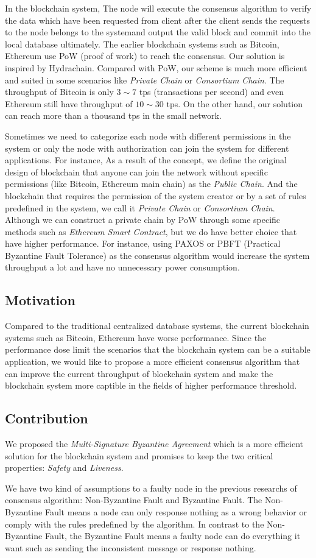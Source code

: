 In the blockchain system, The node will execute the consensus algorithm to verify the data which have been requested from client after the client sends the requests to the node belongs to the systemand output the valid block and commit into the local database ultimately.
The earlier blockchain systems such as Bitcoin, Ethereum use PoW (proof of work) to reach the consensus. 
Our solution is inspired by Hydrachain\cite{Hydrachain}. Compared with PoW, our scheme is much more efficient and suited in some scenarios like {\em Private Chain} or {\em Consortium Chain}.
The throughput of Bitcoin is only $3 \sim 7$ tps (transactions per second)\cite{BitcoinThroughput} and even Ethereum still have throughput of $10 \sim 30$ tps. On the other hand, our solution can reach more than a thousand tps in the small network.\par
	Sometimes we need to categorize each node with different permissions in the system or only the node with authorization can join the system for different applications.
For instance, 
As a result of the concept, we define the original design of blockchain that anyone can join the network without specific permissions (like Bitcoin, Ethereum main chain) as the {\em Public Chain}. 
And the blockchain that requires the permission of the system creator or by a set of rules predefined in the system, we call it {\em Private Chain} or {\em Consortium Chain}.
Although we can construct a private chain by PoW through some specific methods such as {\em Ethereum Smart Contract}, but we do have better choice that have higher performance.
For instance, using PAXOS\cite{PAXOS} or PBFT (Practical Byzantine Fault Tolerance)\cite{PBFT} as the consensus algorithm would increase the system throughput a lot and have no unnecessary power consumption.\par
	\subsection*{Motivation}
	Compared to the traditional centralized database systems, the current blockchain systems such as Bitcoin, Ethereum have worse performance.
Since the performance dose limit the scenarios that the blockchain system can be a suitable application, 
we would like to propose a more efficient consensus algorithm that can improve the current throughput of blockchain system and make the blockchain system more captible in the fields of higher performance threshold.
	\subsection*{Contribution}
	We proposed the {\em Multi-Signature Byzantine Agreement} which is a more efficient solution for the blockchain system and promises to keep the two critical properties: {\em Safety} and {\em Liveness}.\par
We have two kind of assumptions to a faulty node in the previous researchs of consensus algorithm: Non-Byzantine Fault and Byzantine Fault. 
The Non-Byzantine Fault means a node can only response nothing as a wrong behavior or comply with the rules predefined by the algorithm.
In contrast to the Non-Byzantine Fault, the Byzantine Fault means a faulty node can do everything it want such as sending the inconsistent message or response nothing.
